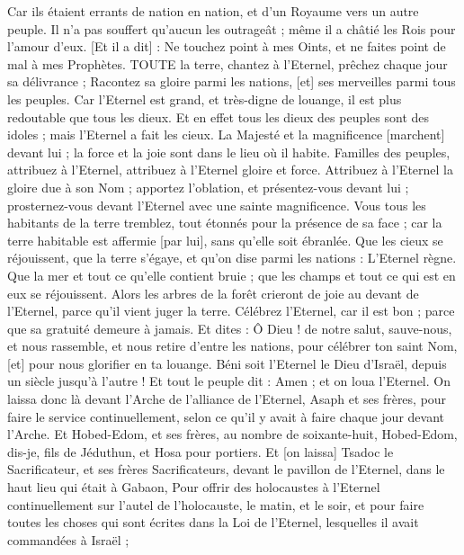 \begin{multicols}{2}
Car ils étaient errants de nation en nation, et d'un Royaume vers un autre peuple.
Il n'a pas souffert qu'aucun les outrageât ; même il a châtié les Rois pour l'amour d'eux.
[Et il a dit] : Ne touchez point à mes Oints, et ne faites point de mal à mes Prophètes.
TOUTE la terre, chantez à l'Eternel, prêchez chaque jour sa délivrance ;
Racontez sa gloire parmi les nations, [et] ses merveilles parmi tous les peuples.
Car l'Eternel est grand, et très-digne de louange, il est plus redoutable que tous les dieux.
Et en effet tous les dieux des peuples sont des idoles ; mais l'Eternel a fait les cieux.
La Majesté et la magnificence [marchent] devant lui ; la force et la joie sont dans le lieu où il habite.
Familles des peuples, attribuez à l'Eternel, attribuez à l'Eternel gloire et force.
Attribuez à l'Eternel la gloire due à son Nom ; apportez l'oblation, et présentez-vous devant lui ; prosternez-vous devant l'Eternel avec une sainte magnificence.
Vous tous les habitants de la terre tremblez, tout étonnés pour la présence de sa face ; car la terre habitable est affermie [par lui], sans qu'elle soit ébranlée.
Que les cieux se réjouissent, que la terre s'égaye, et qu'on dise parmi les nations : L'Eternel règne.
Que la mer et tout ce qu'elle contient bruie ; que les champs et tout ce qui est en eux se réjouissent.
Alors les arbres de la forêt crieront de joie au devant de l'Eternel, parce qu'il vient juger la terre.
Célébrez l'Eternel, car il est bon ; parce que sa gratuité demeure à jamais.
Et dites : Ô Dieu ! de notre salut, sauve-nous, et nous rassemble, et nous retire d'entre les nations, pour célébrer ton saint Nom, [et] pour nous glorifier en ta louange.
Béni soit l'Eternel le Dieu d'Israël, depuis un siècle jusqu'à l'autre ! Et tout le peuple dit : Amen ; et on loua l'Eternel.
On laissa donc là devant l'Arche de l'alliance de l'Eternel, Asaph et ses frères, pour faire le service continuellement, selon ce qu'il y avait à faire chaque jour devant l'Arche.
Et Hobed-Edom, et ses frères, au nombre de soixante-huit, Hobed-Edom, dis-je, fils de Jéduthun, et Hosa pour portiers.
Et [on laissa] Tsadoc le Sacrificateur, et ses frères Sacrificateurs, devant le pavillon de l'Eternel, dans le haut lieu qui était à Gabaon,
Pour offrir des holocaustes à l'Eternel continuellement sur l'autel de l'holocauste, le matin, et le soir, et pour faire toutes les choses qui sont écrites dans la Loi de l'Eternel, lesquelles il avait commandées à Israël ;

\end{multicols}
